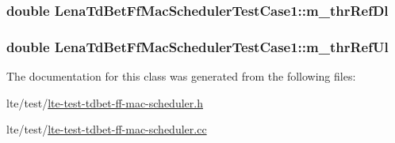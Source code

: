 \subsubsection[{\texorpdfstring{m\+\_\+thr\+Ref\+Dl}{m_thrRefDl}}]{\setlength{\rightskip}{0pt plus 5cm}double Lena\+Td\+Bet\+Ff\+Mac\+Scheduler\+Test\+Case1\+::m\+\_\+thr\+Ref\+Dl\hspace{0.3cm}{\ttfamily [private]}}\hypertarget{classLenaTdBetFfMacSchedulerTestCase1_aa9209c6d7579aee1dc43af183f918d69}{}\label{classLenaTdBetFfMacSchedulerTestCase1_aa9209c6d7579aee1dc43af183f918d69}
\subsubsection[{\texorpdfstring{m\+\_\+thr\+Ref\+Ul}{m_thrRefUl}}]{\setlength{\rightskip}{0pt plus 5cm}double Lena\+Td\+Bet\+Ff\+Mac\+Scheduler\+Test\+Case1\+::m\+\_\+thr\+Ref\+Ul\hspace{0.3cm}{\ttfamily [private]}}\hypertarget{classLenaTdBetFfMacSchedulerTestCase1_a724cc7b548551793c6e071188ea34c88}{}\label{classLenaTdBetFfMacSchedulerTestCase1_a724cc7b548551793c6e071188ea34c88}


The documentation for this class was generated from the following files\+:\begin{DoxyCompactItemize}
\item 
lte/test/\hyperlink{lte-test-tdbet-ff-mac-scheduler_8h}{lte-\/test-\/tdbet-\/ff-\/mac-\/scheduler.\+h}\item 
lte/test/\hyperlink{lte-test-tdbet-ff-mac-scheduler_8cc}{lte-\/test-\/tdbet-\/ff-\/mac-\/scheduler.\+cc}\end{DoxyCompactItemize}
